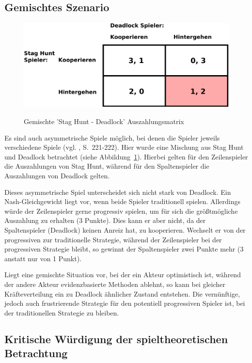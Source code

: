 \subsection{Gemischtes Szenario}

\begin{figure}%
\centering
\caption{Gemischte 'Stag Hunt - Deadlock' Auszahlungsmatrix}
\includegraphics[scale=0.8]{Grafiken/Mixed_Ink.pdf} 
\label{pic:Mixed}
\end{figure}

Es sind auch asymmetrische Spiele möglich, bei denen die Spieler jeweils verschiedene Spiele \grqq{}
(vgl. \cite{Poundstone}, S.~221-222). Hier wurde eine Mischung aus Stag Hunt und Deadlock betrachtet (siehe
Abbildung~\ref{pic:Mixed}). Hierbei gelten für den Zeilenspieler die Auszahlungen von Stag Hunt, während für den
Spaltenspieler die Auszahlungen von Deadlock gelten.

Dieses asymmetrische Spiel unterscheidet sich nicht stark von Deadlock. Ein Nash-Gleichgewicht liegt vor, wenn
beide Spieler traditionell spielen. Allerdings würde der Zeilenspieler gerne progressiv spielen, um für sich die
größtmögliche Auszahlung zu erhalten (3 Punkte). Dies kann er aber nicht, da der Spaltenspieler (Deadlock) keinen Anreiz hat,
zu kooperieren. Wechselt er von der progressiven zur traditionelle Strategie, während der Zeilenspieler bei der progressiven
Strategie bleibt, so gewinnt der Spaltenspieler zwei Punkte mehr (3 anstatt nur von 1 Punkt).

Liegt eine gemischte Situation vor, bei der ein Akteur optimistisch ist, während der andere Akteur evidenzbasierte Methoden
ablehnt, so kann bei gleicher Kräfteverteilung ein zu Deadlock ähnlicher Zustand entstehen. Die vernünftige, jedoch auch frustrierende
Strategie für den potentiell progressiven Spieler ist, bei der traditionellen Strategie zu bleiben. 

\subsection{Kritische Würdigung der spieltheoretischen Betrachtung}

